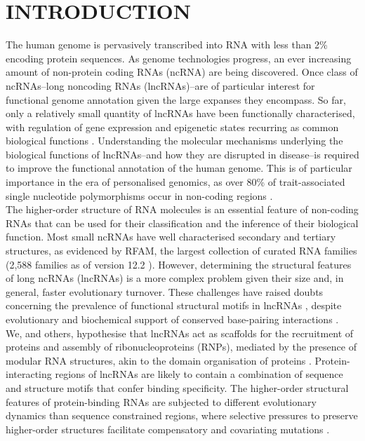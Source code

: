 \documentclass[a4paper,11pt]{article}
\begin{document}
\section{INTRODUCTION}
The human genome is pervasively transcribed into RNA with less than 2\%
encoding protein sequences. As genome technologies progress, an ever 
increasing amount of non-protein coding RNAs (ncRNA) are being discovered.
Once class of ncRNAs--long noncoding RNAs (lncRNAs)--are of particular 
interest for functional genome annotation given the large expanses they encompass. 
So far, only a relatively small quantity of lncRNAs have been functionally characterised, 
with regulation of gene expression and epigenetic states recurring as common 
biological functions \cite{morris2014rise,engreitz2016long}. Understanding the molecular mechanisms 
underlying the biological functions of lncRNAs--and how they are disrupted in disease--is
required to improve the functional annotation of the human genome. This is of
particular importance in the era of personalised genomics, as over 80\% of 
trait-associated single nucleotide polymorphisms occur in  non-coding regions 
\cite{hindorff2009potential,ritchie2014functional}.\\

The higher-order structure of RNA molecules is an essential feature of
non-coding RNAs that can be used for their classification and 
the inference of their biological function. Most small ncRNAs have well 
characterised secondary and tertiary structures, as evidenced by  RFAM, 
the largest collection of curated RNA families (2,588 families as of version 
12.2 \cite{rfam12}). However, determining the structural features of 
 long ncRNAs (lncRNAs) is a more complex problem given their
 size and, in general, faster evolutionary turnover. These challenges
 have raised doubts concerning the prevalence of functional structural 
 motifs in lncRNAs \cite{eddy2014computational,rivas2016statistical}, 
 despite evolutionary and biochemical support of conserved base-pairing 
 interactions \cite{smith2013widespread,spitale2015structural,lu2016rna}.\\

We, and others, hypothesise that lncRNAs act as scaffolds for the 
recruitment of proteins and assembly of ribonucleoproteins (RNPs), 
mediated by the presence of modular RNA structures, akin to the 
domain organisation of proteins 
\cite{zappulla2006rna,hogg2008structured,rinn2012genome,mercer2013structure,smith2013widespread,chujo2016architectural,blythe2016ins}. 
Protein-interacting regions of lncRNAs are likely to contain a combination 
of sequence and structure motifs that confer binding specificity. 
The higher-order structural features of protein-binding RNAs are 
subjected to different evolutionary dynamics than sequence constrained 
regions, where selective pressures to preserve higher-order 
structures facilitate compensatory and covariating mutations 
\cite{pang2006rapid,smith2013widespread,johnsson2014evolutionary}.\\
  
\end{document}
